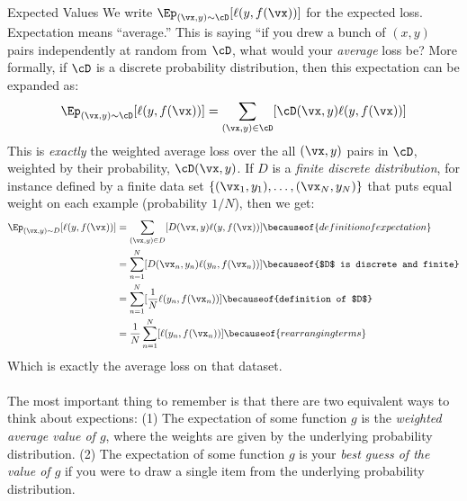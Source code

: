 \begin{mathreview}{Expected Values}
We write $\Ep_{(\vx,y) \sim \cD} [ \ell(y, f(\vx)) ]$ for the expected loss. Expectation means ``average.'' This is saying ``if you drew a bunch of $(x,y)$ pairs independently at random from $\cD$, what would your \emph{average} loss be? %
More formally, if $\cD$ is a discrete probability distribution, then this expectation can be expanded as:
%
\begin{equation}
  \Ep_{(\vx,y) \sim \cD} [ \ell(y, f(\vx)) ] = \sum_{(\vx,y) \in \cD} [ \cD(\vx,y) \ell(y, f(\vx)) ]
\end{equation}
%
This is \emph{exactly} the weighted average loss over the all $(\vx,y)$ pairs in $\cD$, weighted by their probability, $\cD(\vx,y)$.
If $D$ is a \emph{finite discrete distribution}, for instance defined by a finite data set $\{ (\vx_1,y_1), \dots, (\vx_N,y_N)\}$ that puts equal weight on each example (probability $1/N$), then we get:
%
\begin{align}
\Ep_{(\vx,y) \sim D} [ \ell(y, f(\vx)) ]
&= \sum_{(\vx,y) \in D} [ D(\vx,y) \ell(y, f(\vx)) ]
   \becauseof{definition of expectation}\\
&= \sum_{n=1}^N [ D(\vx_n,y_n) \ell(y_n, f(\vx_n)) ]
   \becauseof{$D$ is discrete and finite}\\
&= \sum_{n=1}^N [ \frac 1 N \ell(y_n, f(\vx_n)) ]
   \becauseof{definition of $D$}\\
&= \frac 1 N  \sum_{n=1}^N [ \ell(y_n, f(\vx_n)) ]
   \becauseof{rearranging terms}
\end{align}
%
Which is exactly the average loss on that dataset.
\\~\\
The most important thing to remember is that there are two equivalent ways to think about expections:
(1) The expectation of some function $g$ is the \emph{weighted average value of $g$}, where the weights are given by the underlying probability distribution.
(2) The expectation of some function $g$ is your \emph{best guess of the value of $g$} if you were to draw a single item from the underlying probability distribution.
\end{mathreview}

